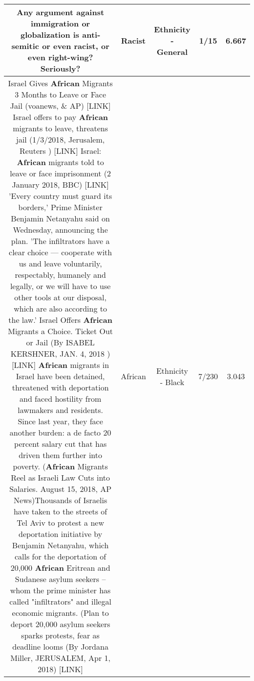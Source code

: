 \documentclass[11pt]{article}
\newlength\mylength
\begin{document}
\begin{center}
\begin{longtable}{|C{.65\mylength}|C{.30\mylength}|C{.12\mylength}|C{.12\mylength}|C{.12\mylength}|}
  \small Any argument against immigration or globalization is anti-semitic or even \textbf{racist}, or even right-wing? Seriously?\normalsize   & Racist & Ethnicity - General & 1/15 & 6.667 \\  \hline
  \small Israel Gives \textbf{African} Migrants 3 Months to Leave or Face Jail  (voanews, \& AP) [LINK] Israel offers to pay \textbf{African} migrants to leave, threatens jail (1/3/2018, Jerusalem, Reuters ) [LINK] Israel: \textbf{African} migrants told to leave or face imprisonment (2 January 2018, BBC) [LINK] 'Every country must guard its borders,' Prime Minister Benjamin Netanyahu said on Wednesday, announcing the plan. 'The infiltrators have a clear choice — cooperate with us and leave voluntarily, respectably, humanely and legally, or we will have to use other tools at our disposal, which are also according to the law.' Israel Offers \textbf{African} Migrants a Choice.  Ticket Out or Jail (By ISABEL KERSHNER, JAN. 4, 2018 ) [LINK] \textbf{African} migrants in Israel have been detained, threatened with deportation and faced hostility from lawmakers and residents. Since last year, they face another burden: a de facto 20 percent salary cut that has driven them further into poverty.  (\textbf{African} Migrants Reel as Israeli Law Cuts into Salaries. August 15, 2018,  AP News)Thousands of Israelis have taken to the streets of Tel Aviv to protest a new deportation initiative by Benjamin Netanyahu, which calls for the deportation of 20,000 \textbf{African} Eritrean and Sudanese asylum seekers -- whom the prime minister has called "infiltrators" and illegal economic migrants. (Plan to deport 20,000 asylum seekers sparks protests, fear as deadline looms (By Jordana Miller,  JERUSALEM,  Apr 1, 2018) [LINK] \normalsize   & African & Ethnicity - Black & 7/230 & 3.043 \\  \hline

\end{longtable}
\end{center}
\end{document}
